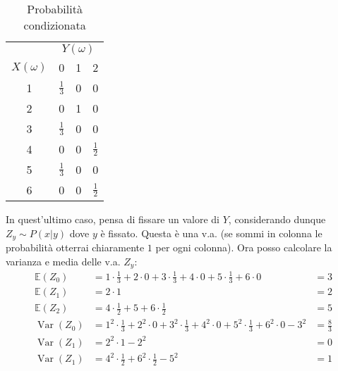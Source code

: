 \begin{center}
	\begin{table}[H]
		\begin{center}
			\begin{tabular}{|c|ccc|}
				\hline
				            & \multicolumn{3}{c|}{$Y(\omega)$}                       \\
				$X(\omega)$ & 0                                & 1 & 2               \\
				\hline 1    & $\frac{1}{3}$                    & 0 & 0               \\
				2           & 0                                & 1 & 0               \\
				3           & $\frac{1}{3}$                    & 0 & 0               \\
				4           & 0                                & 0 & $\frac{1}{2}$   \\
				5           & $\frac{1}{3}$                    & 0 & 0               \\
				6           & 0                                & 0 & $ \frac{1}{2} $ \\
				\hline
			\end{tabular}
		\end{center}
		\caption{Probabilità condizionata}
	\end{table}
\end{center}
In quest'ultimo caso, pensa di fissare un valore di $ Y $, considerando dunque $ Z_y \sim P\left(x | y\right) $ dove $ y $ è fissato. Questa è una v.a. (se sommi in colonna le probabilità otterrai chiaramente $ 1 $ per ogni colonna). Ora posso calcolare la varianza e media delle v.a. $ Z_y $:
\begin{align*}
	\mathbb{E} \left(Z_0\right)         & = 1 \cdot \frac{1}{3} + 2 \cdot 0 + 3 \cdot \frac{1}{3} + 4 \cdot 0 + 5 \cdot \frac{1}{3} + 6 \cdot 0                        & = 3           \\
	\mathbb{E} \left(Z_1\right)         & =   2 \cdot 1                                                                                                                & = 2           \\
	\mathbb{E} \left(Z_2\right)         & =  4 \cdot  \frac{1}{2} + 5  + 6 \cdot  \frac{1}{2}                                                                          & =5            \\
	\operatorname{Var} \left(Z_0\right) & = 1^2 \cdot \frac{1}{3} + 2^2 \cdot 0 + 3^2 \cdot \frac{1}{3} + 4^2 \cdot 0 + 5^2  \cdot  \frac{1}{3} + 6 ^2  \cdot  0 - 3^2 & = \frac{8}{3} \\
	\operatorname{Var} \left(Z_1\right) & = 2^2  \cdot  1 - 2^2                                                                                                        & = 0           \\
	\operatorname{Var} \left(Z_1\right) & = 4^2 \cdot  \frac{1}{2} + 6^2  \cdot \frac{1}{2} - 5^2                                                                      & = 1
\end{align*}

